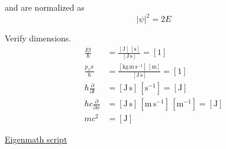and are normalized as
\begin{equation*}
|\psi|^2=2E
\end{equation*}

Verify dimensions.
\begin{align*}
\frac{Et}{\hbar}
&=\frac{[\text{J}]\,[\text{s}]}{[\text{J}\,\text{s}]}=[1]
\\[1ex]
\frac{p_xx}{\hbar}
&=\frac{[\text{kg}\,\text{m}\,\text{s}^{-1}]\,[\text{m}]}{[\text{J}\,\text{s}]}=[1]
\\[1ex]
\hbar\frac{\partial}{\partial t}
&=[\text{J}\,\text{s}]\,[\text{s}^{-1}]=[\text{J}]
\\[1ex]
\hbar c\frac{\partial}{\partial x}
&=[\text{J}\,\text{s}]\,[\text{m}\,\text{s}^{-1}]\,[\text{m}^{-1}]=[\text{J}]
\\[1ex]
mc^2&=[\text{J}]
\end{align*}

\href{https://georgeweigt.github.io/examples/dirac-equation-3-demo.html}{Eigenmath script}



